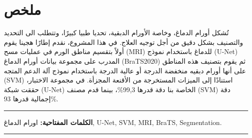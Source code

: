 \chapter*{\hfill  ملخص \hfill}

تُشكل أورام الدماغ، وخاصة الأورام الدبقية، تحديا طبيا كبيرًا، وتتطلب  الى التحديد والتصنيف بشكل دقيق من أجل توجيه العلاج. في هذا المشروع، نقدم إطارًا هجينا يقوم أولاً بتقسيم مناطق الورم في عمليات مسح \textenglish{(MRI)} للدماغ باستخدام نموذج \textenglish{(U-Net)} المدرب على مجموعة بيانات أورام الدماغ (\textenglish{BraTS2020}) ثم يقوم بتصنيف هذه المناطق على أنها أورام دبقيه منخفضة الدرجة أو عالية الدرجة باستخدام نموذج آلة الدعم المتجه \textenglish{(SVM)} استنادًا إلى الميزات المستخرجة من الأقنعة المجزأة. في مجموعة الاختبار، حققت شبكة \textenglish{(U-Net)} الخاصة بنا دقة قدرها \textenglish{99,3\%}، بينما قدم مصنف \textenglish{(SVM)} دقة إجمالية قدرها \textenglish{93\%}.

\noindent\rule{\textwidth}{0.2pt}
\textbf{الكلمات المفتاحية:} اورام الدماغ, \textenglish{U-Net}, \textenglish{SVM}, \textenglish{MRI}, \textenglish{BraTS}, \textenglish{Segmentation}.\\
\noindent\rule{\textwidth}{0.2pt}